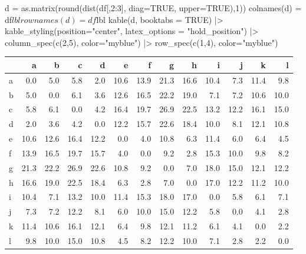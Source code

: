 \documentclass[a4paper]{article}\usepackage[]{graphicx}\usepackage[]{xcolor}
\begin{document}
\begin{Schunk}
\begin{Sinput}
d = as.matrix(round(dist(df[,2:3], diag=TRUE, upper=TRUE),1))
colnames(d) = df$lbl
rownames(d) = df$lbl
kable(d, booktabs = TRUE) |>
  kable_styling(position="center", latex_options = "hold_position") |>
  column_spec(c(2,5), color="myblue") |>
  row_spec(c(1,4), color="myblue")
\end{Sinput}
\begin{table}[!h]
\centering
\begin{tabular}{l>{}rrr>{}rrrrrrrrr}
\toprule
  & a & b & c & d & e & f & g & h & i & j & k & l\\
\midrule
\textcolor{myblue}{a} & \textcolor{myblue}{0.0} & \textcolor{myblue}{5.0} & \textcolor{myblue}{5.8} & \textcolor{myblue}{2.0} & \textcolor{myblue}{10.6} & \textcolor{myblue}{13.9} & \textcolor{myblue}{21.3} & \textcolor{myblue}{16.6} & \textcolor{myblue}{10.4} & \textcolor{myblue}{7.3} & \textcolor{myblue}{11.4} & \textcolor{myblue}{9.8}\\
b & \textcolor{myblue}{5.0} & 0.0 & 6.1 & \textcolor{myblue}{3.6} & 12.6 & 16.5 & 22.2 & 19.0 & 7.1 & 7.2 & 10.6 & 10.0\\
c & \textcolor{myblue}{5.8} & 6.1 & 0.0 & \textcolor{myblue}{4.2} & 16.4 & 19.7 & 26.9 & 22.5 & 13.2 & 12.2 & 16.1 & 15.0\\
\textcolor{myblue}{d} & \textcolor{myblue}{2.0} & \textcolor{myblue}{3.6} & \textcolor{myblue}{4.2} & \textcolor{myblue}{0.0} & \textcolor{myblue}{12.2} & \textcolor{myblue}{15.7} & \textcolor{myblue}{22.6} & \textcolor{myblue}{18.4} & \textcolor{myblue}{10.0} & \textcolor{myblue}{8.1} & \textcolor{myblue}{12.1} & \textcolor{myblue}{10.8}\\
e & \textcolor{myblue}{10.6} & 12.6 & 16.4 & \textcolor{myblue}{12.2} & 0.0 & 4.0 & 10.8 & 6.3 & 11.4 & 6.0 & 6.4 & 4.5\\
\addlinespace
f & \textcolor{myblue}{13.9} & 16.5 & 19.7 & \textcolor{myblue}{15.7} & 4.0 & 0.0 & 9.2 & 2.8 & 15.3 & 10.0 & 9.8 & 8.2\\
g & \textcolor{myblue}{21.3} & 22.2 & 26.9 & \textcolor{myblue}{22.6} & 10.8 & 9.2 & 0.0 & 7.0 & 18.0 & 15.0 & 12.1 & 12.2\\
h & \textcolor{myblue}{16.6} & 19.0 & 22.5 & \textcolor{myblue}{18.4} & 6.3 & 2.8 & 7.0 & 0.0 & 17.0 & 12.2 & 11.2 & 10.0\\
i & \textcolor{myblue}{10.4} & 7.1 & 13.2 & \textcolor{myblue}{10.0} & 11.4 & 15.3 & 18.0 & 17.0 & 0.0 & 5.8 & 6.1 & 7.1\\
j & \textcolor{myblue}{7.3} & 7.2 & 12.2 & \textcolor{myblue}{8.1} & 6.0 & 10.0 & 15.0 & 12.2 & 5.8 & 0.0 & 4.1 & 2.8\\
\addlinespace
k & \textcolor{myblue}{11.4} & 10.6 & 16.1 & \textcolor{myblue}{12.1} & 6.4 & 9.8 & 12.1 & 11.2 & 6.1 & 4.1 & 0.0 & 2.2\\
l & \textcolor{myblue}{9.8} & 10.0 & 15.0 & \textcolor{myblue}{10.8} & 4.5 & 8.2 & 12.2 & 10.0 & 7.1 & 2.8 & 2.2 & 0.0\\
\bottomrule
\end{tabular}
\end{table}

\end{Schunk}
\end{document}
